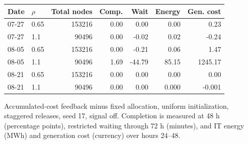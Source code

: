 \par\medskip\Needspace{148pt}
\noindent\begin{minipage}{\textwidth}
\centering\footnotesize\setlength{\tabcolsep}{3pt}\renewcommand{\arraystretch}{1.13}
\label{tab:app-pressure}
\begin{tabular*}{\textwidth}{@{\extracolsep{\fill}}llrrrrr@{}}
\toprule
Date & $\rho$ & Total nodes & Comp. & Wait & Energy & Gen. cost\\
\midrule
07-27 & 0.65 & 153216 & 0.00 & 0.00 & 0.00 & 0.23\\
07-27 & 1.1 & 90496 & 0.00 & -0.02 & 0.02 & -0.24\\
08-05 & 0.65 & 153216 & 0.00 & -0.21 & 0.06 & 1.47\\
08-05 & 1.1 & 90496 & 1.69 & -44.79 & 85.15 & 1245.17\\
08-21 & 0.65 & 153216 & 0.00 & 0.00 & 0.00 & 0.00\\
08-21 & 1.1 & 90496 & 0.00 & 0.00 & 0.000 & -0.001\\
\bottomrule\end{tabular*}
\par\smallskip\raggedright Accumulated-cost feedback minus fixed allocation, uniform initialization, staggered releases, seed 17, signal off. Completion is measured at 48 h (percentage points), restricted waiting through 72 h (minutes), and IT energy (MWh) and generation cost (currency) over hours 24--48.
\end{minipage}\par\medskip
